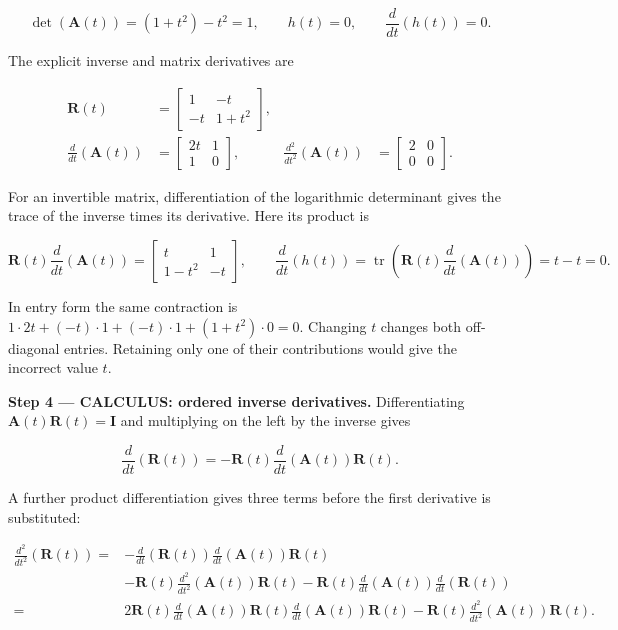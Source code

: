 \documentclass[11pt,oneside,openany]{book}
\begin{document}
\[
\det(\mathbf A(t))=(1+t^2)-t^2=1,
\qquad h(t)=0,\qquad \frac{d}{dt}\left(h(t)\right)=0.
\]

The explicit inverse and matrix derivatives are

\[
\begin{aligned}
\mathbf R(t)&=\begin{bmatrix}1&-t\\-t&1+t^2\end{bmatrix},\\
\frac{d}{dt}\left(\mathbf A(t)\right)&=\begin{bmatrix}2t&1\\1&0\end{bmatrix},&
\frac{d^2}{dt^2}\left(\mathbf A(t)\right)&=\begin{bmatrix}2&0\\0&0\end{bmatrix}.
\end{aligned}
\]

For an invertible matrix, differentiation of the logarithmic determinant gives the trace of the inverse times its derivative. Here its product is

\[
\mathbf R(t)\frac{d}{dt}\left(\mathbf A(t)\right)
=\begin{bmatrix}t&1\\1-t^2&-t\end{bmatrix},
\qquad
\frac{d}{dt}\left(h(t)\right)
=\operatorname{tr}\left(\mathbf R(t)\frac{d}{dt}\left(\mathbf A(t)\right)\right)=t-t=0.
\]

In entry form the same contraction is \(1\cdot2t+(-t)\cdot1+(-t)\cdot1+(1+t^2)\cdot0=0\). Changing \(t\) changes both off-diagonal entries. Retaining only one of their contributions would give the incorrect value \(t\).

\endgroup
\textbf{Step 4 --- CALCULUS: ordered inverse derivatives.} Differentiating \(\mathbf A(t)\mathbf R(t)=\mathbf I\) and multiplying on the left by the inverse gives

\[
\frac{d}{dt}\left(\mathbf R(t)\right)
=-\mathbf R(t)\frac{d}{dt}\left(\mathbf A(t)\right)\mathbf R(t).
\]

A further product differentiation gives three terms before the first derivative is substituted:

\[
\begin{aligned}
\frac{d^2}{dt^2}\left(\mathbf R(t)\right)
={}&-\frac{d}{dt}\left(\mathbf R(t)\right)\frac{d}{dt}\left(\mathbf A(t)\right)\mathbf R(t)\\
&-\mathbf R(t)\frac{d^2}{dt^2}\left(\mathbf A(t)\right)\mathbf R(t)
-\mathbf R(t)\frac{d}{dt}\left(\mathbf A(t)\right)\frac{d}{dt}\left(\mathbf R(t)\right)\\
={}&2\mathbf R(t)\frac{d}{dt}\left(\mathbf A(t)\right)\mathbf R(t)
\frac{d}{dt}\left(\mathbf A(t)\right)\mathbf R(t)
-\mathbf R(t)\frac{d^2}{dt^2}\left(\mathbf A(t)\right)\mathbf R(t).
\end{aligned}
\]
\end{document}
